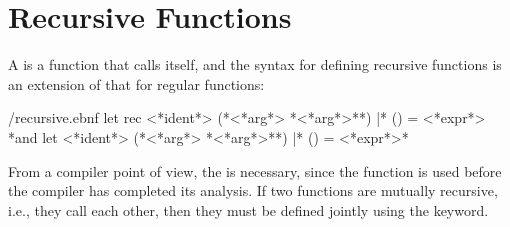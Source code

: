 \documentclass[fsharpNotes.tex]{subfiles}
\begin{document}
\section{Recursive Functions}
A  is a function that calls itself, and the syntax for defining recursive functions is an extension of that for regular functions:
%
\begin{verbatimwrite}{\ebnf/recursive.ebnf}
let rec <*ident*> (*<*arg*> {*<*arg*>*}*) |* () =
  <*expr*>
{*and let <*ident*> (*<*arg*> {*<*arg*>*}*) |* () =
  <*expr*>*}
\end{verbatimwrite}
%
From a compiler point of view, the  is necessary, since the function is used before the compiler has completed its analysis. If two functions are mutually recursive, i.e., they call each other, then they must be defined jointly using the  keyword.
\end{document}
